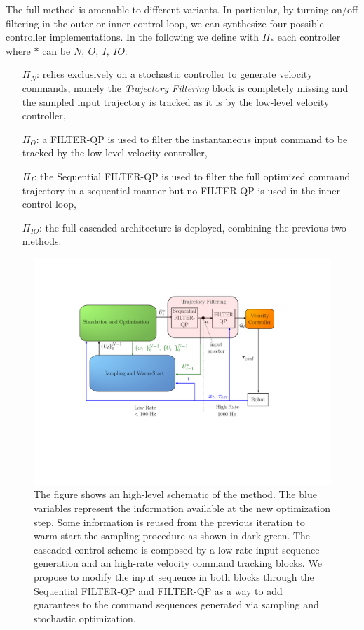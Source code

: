 The full method is amenable to different variants. In particular, by turning on/off filtering in the outer or inner control loop, we can synthesize four possible controller implementations. In the following we define with $\Pi_{*}$ each controller where $*$ can be $N,\ O,\ I,\ IO$:
\begin{itemize}
    \item[$\Pi_{N}$:] relies exclusively on a stochastic controller to generate velocity commands, namely the \textit{Trajectory Filtering} block is completely missing and the sampled input trajectory is tracked as it is by the low-level velocity controller,
    \item[$\Pi_{O}$:] a FILTER-QP is used to filter the instantaneous input command to be tracked by the low-level velocity controller,
    \item[$\Pi_{I}$:] the Sequential FILTER-QP is used to filter the full optimized command trajectory in a sequential manner but no FILTER-QP is used in the inner control loop,
    \item[$\Pi_{IO}$:] the full cascaded architecture is deployed, combining the previous two methods.
\end{itemize}

\begin{figure}[t!]
\centering
\vspace{-0.5cm}
\includegraphics[trim=120 0 50 0, clip, width=0.95\columnwidth] {figures/schemes/receding_horizon_paper.pdf}
\caption{The figure shows an high-level schematic of the method. The blue variables represent the information available at the new optimization step. Some information is reused from the previous iteration to warm start the sampling procedure as shown in dark green. The cascaded control scheme is composed by a low-rate input sequence generation and an high-rate velocity command tracking blocks. We propose to modify the input sequence in both blocks through the Sequential FILTER-QP and FILTER-QP as a way to add guarantees to the command sequences generated via sampling and stochastic optimization.} \label{fig:block_scheme}
\end{figure}


